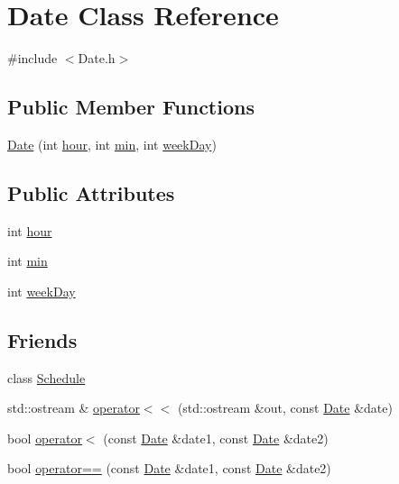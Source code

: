 \hypertarget{classDate}{}\section{Date Class Reference}
\label{classDate}


{\ttfamily \#include $<$Date.\+h$>$}

\subsection*{Public Member Functions}
\begin{DoxyCompactItemize}
\item 
\hyperlink{classDate_acc684157f4e48b78b5aa9268bca10e3c}{Date} (int \hyperlink{classDate_a59f93395dbec8ce9945f2ea091250c42}{hour}, int \hyperlink{classDate_a3e2870587849f6dc96e83b1b767e3854}{min}, int \hyperlink{classDate_abc9d37a992598e0176df74f520cb202c}{week\+Day})
\end{DoxyCompactItemize}
\subsection*{Public Attributes}
\begin{DoxyCompactItemize}
\item 
int \hyperlink{classDate_a59f93395dbec8ce9945f2ea091250c42}{hour}
\item 
int \hyperlink{classDate_a3e2870587849f6dc96e83b1b767e3854}{min}
\item 
int \hyperlink{classDate_abc9d37a992598e0176df74f520cb202c}{week\+Day}
\end{DoxyCompactItemize}
\subsection*{Friends}
\begin{DoxyCompactItemize}
\item 
class \hyperlink{classDate_aae5808dc2e987bf17ef42196457a654d}{Schedule}
\item 
std\+::ostream \& \hyperlink{classDate_a979c6b0ce07a9560a2129b81363b84f9}{operator$<$$<$} (std\+::ostream \&out, const \hyperlink{classDate}{Date} \&date)
\item 
bool \hyperlink{classDate_aa2e695ccf211714fafbc8c73cb7e5419}{operator$<$} (const \hyperlink{classDate}{Date} \&date1, const \hyperlink{classDate}{Date} \&date2)
\item 
bool \hyperlink{classDate_a588c6068972f9e69bc50292405c1fac7}{operator==} (const \hyperlink{classDate}{Date} \&date1, const \hyperlink{classDate}{Date} \&date2)
\end{DoxyCompactItemize}


